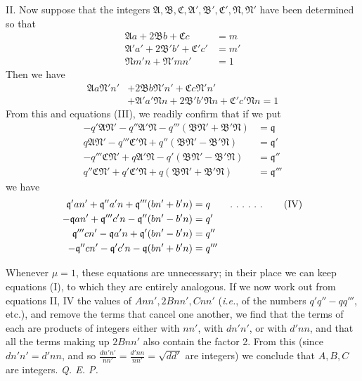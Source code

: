 II. Now suppose that the integers $\mathfrak{A},\mathfrak{B},\mathfrak{C},\mathfrak{A}',\mathfrak{B}',\mathfrak{C}',\mathfrak{N},\mathfrak{N}'$ have been determined so that
\[
\begin{aligned}
\mathfrak{A}a+2\mathfrak{B}b+\mathfrak{C}c&=m\\
\mathfrak{A}'a'+2\mathfrak{B}'b'+\mathfrak{C}'c'&=m'\\
\mathfrak{N}m'n+\mathfrak{N}'mn'&=1
\end{aligned}
\]
Then we have
\[
\begin{aligned}\mathfrak{A}a\mathfrak{N}'n'&+2\mathfrak{B}b\mathfrak{N}'n'+\mathfrak{C}c\mathfrak{N}'n'\\&+\mathfrak{A}'a'\mathfrak{N}n+2\mathfrak{B}'b'\mathfrak{N}n+\mathfrak{C}'c'\mathfrak{N}n=1\end{aligned}
\]
From this and equations (III), we readily confirm that if we put
\[
\begin{aligned}
-q'\mathfrak{A}\mathfrak{N}'-q''\mathfrak{A}'\mathfrak{N}-q'''(\mathfrak{B}\mathfrak{N}'+\mathfrak{B}'\mathfrak{N})&=\mathfrak{q}\\
q\mathfrak{A}\mathfrak{N}'-q'''\mathfrak{C}'\mathfrak{N}+q''(\mathfrak{B}\mathfrak{N}'-\mathfrak{B}'\mathfrak{N})&=\mathfrak{q}'\\
-q'''\mathfrak{C}\mathfrak{N}'+q\mathfrak{A}'\mathfrak{N}-q'(\mathfrak{B}\mathfrak{N}'-\mathfrak{B}'\mathfrak{N})&=\mathfrak{q}''\\
q''\mathfrak{C}\mathfrak{N}'+q'\mathfrak{C}'\mathfrak{N}+q(\mathfrak{B}\mathfrak{N}'+\mathfrak{B}'\mathfrak{N})&=\mathfrak{q}'''
\end{aligned}
\]
we have
\[
\begin{aligned}
\mathfrak{q}'an'+\mathfrak{q}''a'n+\mathfrak{q}'''(bn'+b'n)&=q\qquad\ldotp\,\ldotp\,\ldotp\,\ldotp\,\ldotp\,\ldotp\qquad\text{(IV)}\\
-\mathfrak{q}an'+\mathfrak{q}'''c'n-\mathfrak{q}''(bn'-b'n)&=q'\\
\mathfrak{q}'''cn'-\mathfrak{q}a'n+\mathfrak{q}'(bn'-b'n)&=q''\\
-\mathfrak{q}''cn'-\mathfrak{q}'c'n-\mathfrak{q}(bn'+b'n)&=q'''
\end{aligned}
\]

Whenever $\mu=1$, these equations are unnecessary; in their place we can keep equations (I), to which they are entirely analogous. If we now work out from equations II, IV the values of $Ann',2Bnn',Cnn'$ (\textit{i.e.}, of the numbers $q'q''-qq'''$, etc.), and remove the terms that cancel one another, we find that the terms of each
are products of integers either with $nn'$, with $dn'n'$, or with $d'nn$, and that all the terms making up $2Bnn'$ also contain the factor 2. From this (since $dn'n'=d'nn$, and so $\frac{dn'n'}{nn'}=\frac{d'nn}{nn'}=\sqrt{dd'}$ are integers) we conclude that $A,B,C$ are integers. \textit{Q. E. P.}

